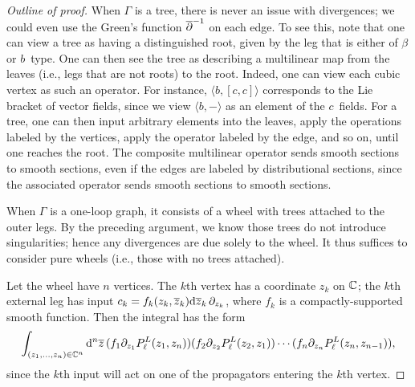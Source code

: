 
\begin{proof}[Outline of proof]
When $\Gamma$ is a tree, there is never an issue with divergences; 
we could even use the Green's function $\overline{\partial}^{-1}$ on each edge.
To see this, note that one can view a tree as having a distinguished root,
given by the leg that is either of $\beta$ or $b$~type.
One can then see the tree as describing a multilinear map from the leaves (i.e., legs that are not roots) to the root.
Indeed, one can view each cubic vertex as such an operator.
For instance, $\langle b, [c,c]\rangle$ corresponds to the Lie bracket of vector fields,
since we view $\langle b,-\rangle$ as an element of the $c$~fields.
For a tree, one can then input arbitrary elements into the leaves, 
apply the operations labeled by the vertices,
apply the operator labeled by the edge, and so on,
until one reaches the root.
The composite multilinear operator sends smooth sections to smooth sections,
even if the edges are labeled by distributional sections,
since the associated operator sends smooth sections to smooth sections.

When $\Gamma$ is a one-loop graph, it consists of a wheel with trees attached to the outer legs.
By the preceding argument, we know those trees do not introduce singularities;
hence any divergences are due solely to the wheel.
It thus suffices to consider pure wheels (i.e., those with no trees attached).

Let the wheel have $n$ vertices. 
The $k$th vertex has a coordinate $z_k$ on $\mathbb C$;
the $k$th external leg has input $c_k = f_k(z_k,\overline{z}_k) {\rm d}\overline{z}_k\, \partial_{z_k}$, 
where $f_k$ is a compactly-supported smooth function.
Then the integral has the form
\[
\int_{(z_1,\ldots,z_n) \in \mathbb C^n}{\rm d}^n \overline{z} \,(f_1  \partial_{z_1} P_\ell^L(z_1,z_n))(f_2 \partial_{z_2} P_\ell^L(z_2,z_1)) \cdots (f_n\partial_{z_n} P_\ell^L(z_n,z_{n-1})),
\] 
since the $k$th input will act on one of the propagators entering the $k$th vertex.


\end{proof}
